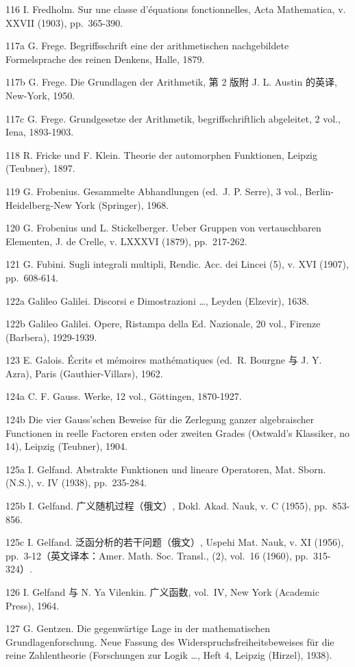 116 I. Fredholm. Sur une classe d'équations fonctionnelles, Acta Mathematica, v. XXVII (1903), pp.~365-390.

117a G. Frege. Begriffsschrift eine der arithmetischen nachgebildete Formelsprache des reinen Denkens, Halle, 1879.

117b G. Frege. Die Grundlagen der Arithmetik, 第 2 版附 J. L. Austin 的英译, New-York, 1950.

117c G. Frege. Grundgesetze der Arithmetik, begriffschriftlich abgeleitet, 2 vol., Iena, 1893-1903.

118 R. Fricke und F. Klein. Theorie der automorphen Funktionen, Leipzig (Teubner), 1897.

119 G. Frobenius. Gesammelte Abhandlungen (ed.~J. P. Serre), 3 vol., Berlin-Heidelberg-New York (Springer), 1968.

120 G. Frobenius und L. Stickelberger. Ueber Gruppen von vertauschbaren Elementen, J. de Crelle, v. LXXXVI (1879), pp.~217-262.

121 G. Fubini. Sugli integrali multipli, Rendic. Acc. dei Lincei (5), v. XVI (1907), pp.~608-614.

122a Galileo Galilei. Discorsi e Dimostrazioni \ldots, Leyden (Elzevir), 1638.

122b Galileo Galilei. Opere, Ristampa della Ed. Nazionale, 20 vol., Firenze (Barbera), 1929-1939.

123 E. Galois. Écrits et mémoires mathématiques (ed.~R. Bourgne 与 J. Y. Azra), Paris (Gauthier-Villars), 1962.

124a C. F. Gauss. Werke, 12 vol., Göttingen, 1870-1927.

124b Die vier Gauss'schen Beweise für die Zerlegung ganzer algebraischer Functionen in reelle Factoren ersten oder zweiten Grades (Ostwald's Klassiker, no 14), Leipzig (Teubner), 1904.

125a I. Gelfand. Abstrakte Funktionen und lineare Operatoren, Mat. Sborn. (N.S.), v. IV (1938), pp.~235-284.

125b I. Gelfand. 广义随机过程（俄文）, Dokl. Akad. Nauk, v. C (1955), pp.~853-856.

125c I. Gelfand. 泛函分析的若干问题（俄文）, Uspehi Mat. Nauk, v. XI (1956), pp.~3-12（英文译本：Amer. Math. Soc. Transl., (2), vol.~16 (1960), pp.~315-324）.

126 I. Gelfand 与 N. Ya Vilenkin. 广义函数, vol.~IV, New York (Academic Press), 1964.

127 G. Gentzen. Die gegenwärtige Lage in der mathematischen Grundlagenforschung. Neue Fassung des Widerspruchsfreiheitsbeweises für die reine Zahlentheorie (Forschungen zur Logik \ldots, Heft 4, Leipzig (Hirzel), 1938).

